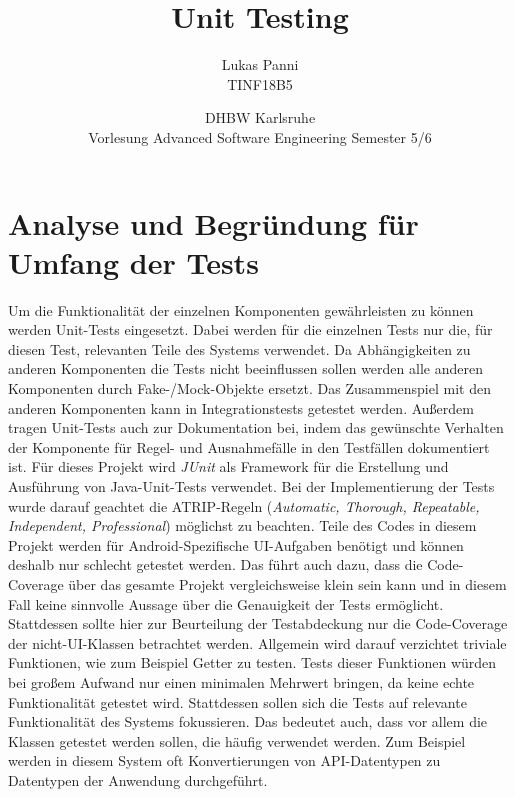 \documentclass[12pt]{article}
\title{Unit Testing}
\date{DHBW Karlsruhe\\ Vorlesung Advanced Software Engineering Semester 5/6}
\author{Lukas Panni \\ TINF18B5}
\begin{document}
\maketitle

\newpage
\tableofcontents
\newpage


\section{Analyse und Begründung für Umfang der Tests}

Um die Funktionalität der einzelnen Komponenten gewährleisten zu können werden Unit-Tests eingesetzt.
Dabei werden für die einzelnen Tests nur die, für diesen Test, relevanten Teile des Systems verwendet.
Da Abhängigkeiten zu anderen Komponenten die Tests nicht beeinflussen sollen werden alle anderen Komponenten durch Fake-/Mock-Objekte ersetzt.
Das Zusammenspiel mit den anderen Komponenten kann in Integrationstests getestet werden.
Außerdem tragen Unit-Tests auch zur Dokumentation bei, indem das gewünschte Verhalten der Komponente für Regel- und Ausnahmefälle in den Testfällen dokumentiert ist.
\newline
Für dieses Projekt wird \textit{JUnit} als Framework für die Erstellung und Ausführung von Java-Unit-Tests verwendet.
Bei der Implementierung der Tests wurde darauf geachtet die ATRIP-Regeln (\textit{Automatic, Thorough, Repeatable, Independent, Professional}) möglichst zu beachten.
\newline
Teile des Codes in diesem Projekt werden für Android-Spezifische UI-Aufgaben benötigt und können deshalb nur schlecht getestet werden. Das führt auch dazu, dass die Code-Coverage über das gesamte Projekt vergleichsweise klein sein kann und in diesem Fall keine sinnvolle Aussage über die Genauigkeit der Tests ermöglicht.
Stattdessen sollte hier zur Beurteilung der Testabdeckung nur die Code-Coverage der nicht-UI-Klassen betrachtet werden.
\newline
Allgemein wird darauf verzichtet triviale Funktionen, wie zum Beispiel Getter zu testen.
Tests dieser Funktionen würden bei großem Aufwand nur einen minimalen Mehrwert bringen, da keine echte Funktionalität getestet wird.
Stattdessen sollen sich die Tests auf relevante Funktionalität des Systems fokussieren. Das bedeutet auch, dass vor allem die Klassen getestet werden sollen, die häufig verwendet werden.
\newline
\newline
Zum Beispiel werden in diesem System oft Konvertierungen von API-Datentypen zu Datentypen der Anwendung durchgeführt.
\end{document}

